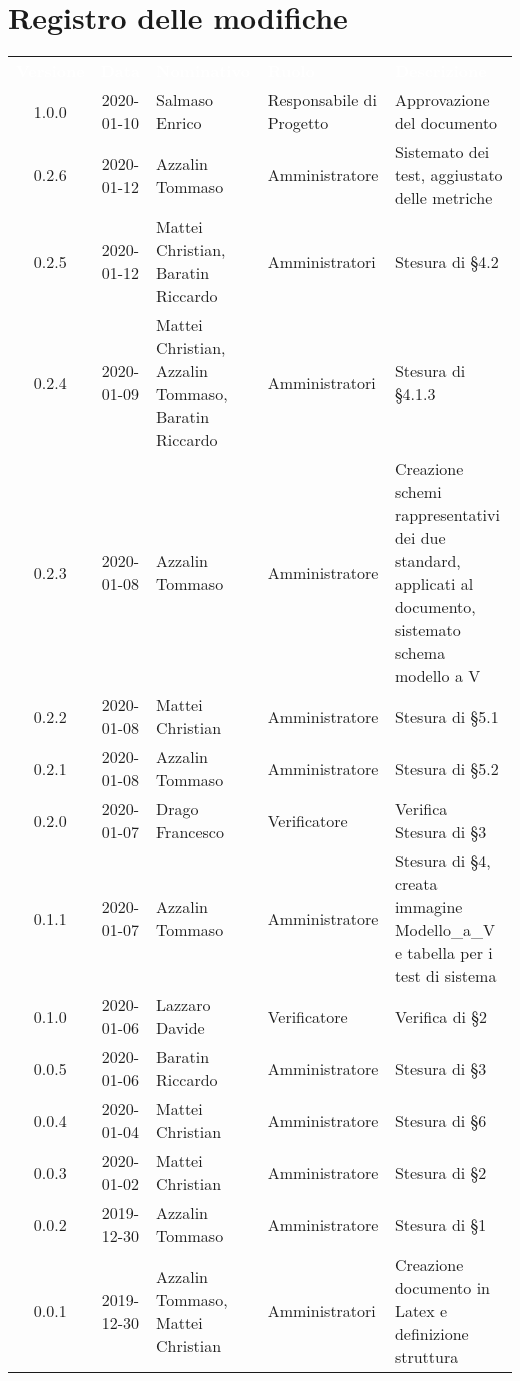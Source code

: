 \section*{Registro delle modifiche}
{
\renewcommand{\arraystretch}{1.5}
\centering
\begin{longtable}{ c c  C{4cm}  C{3cm} C{4cm}}
\textcolor{white}{\textbf{Versione}} & \textcolor{white}{\textbf{Data}} & \textcolor{white}{\textbf{Nominativo}} & \textcolor{white}{\textbf{Ruolo}} & \textcolor{white}{\textbf{Descrizione}}\\	

1.0.0 & 2020-01-10 & Salmaso Enrico & Responsabile di Progetto & Approvazione del documento \\	

0.2.6 & 2020-01-12 & Azzalin Tommaso & Amministratore & Sistemato dei test, aggiustato delle metriche \\
0.2.5 & 2020-01-12 & Mattei Christian, Baratin Riccardo & Amministratori & Stesura di §4.2 \\
0.2.4 & 2020-01-09 & Mattei Christian, Azzalin Tommaso, Baratin Riccardo & Amministratori & Stesura di §4.1.3 \\
0.2.3 & 2020-01-08 & Azzalin Tommaso & Amministratore & Creazione schemi rappresentativi dei due standard, applicati al documento, sistemato schema modello a V \\
0.2.2 & 2020-01-08 & Mattei Christian & Amministratore & Stesura di §5.1 \\
0.2.1 & 2020-01-08 & Azzalin Tommaso & Amministratore & Stesura di §5.2 \\
0.2.0 & 2020-01-07 & Drago Francesco & Verificatore & Verifica Stesura di §3 \\
0.1.1 & 2020-01-07 & Azzalin Tommaso & Amministratore & Stesura di §4, creata immagine Modello\_a\_V e tabella per i test di sistema \\
0.1.0 & 2020-01-06 & Lazzaro Davide & Verificatore & Verifica di §2 \\
0.0.5 & 2020-01-06 & Baratin Riccardo & Amministratore & Stesura di §3 \\
0.0.4 & 2020-01-04 & Mattei Christian & Amministratore & Stesura di §6 \\
0.0.3 & 2020-01-02 & Mattei Christian & Amministratore & Stesura di §2 \\
0.0.2 & 2019-12-30 & Azzalin Tommaso & Amministratore & Stesura di §1 \\
0.0.1 & 2019-12-30 & Azzalin Tommaso, Mattei Christian & Amministratori & Creazione documento in Latex e definizione struttura \\	
		
\end{longtable}
}
